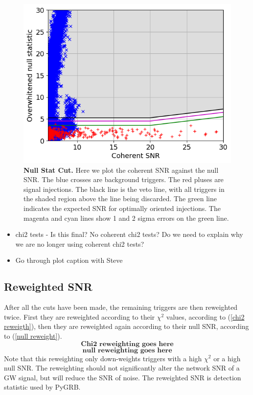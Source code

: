 \documentclass[11pt]{cuthesis}
\begin{document}
\begin{figure} %
\begin{center}
\includegraphics[width=0.8\linewidth]{GRB170817A_null_stat2_vs_snr_zoom.png}
\end{center}
\caption{\textbf{Null Stat Cut.} Here we plot the coherent SNR against the null SNR. The blue crosses are background triggers. The red pluses are signal injections. The black line is the veto line, with all triggers in the shaded region above the line being discarded. The green line indicates the expected SNR for optimally oriented injections. The magenta and cyan lines show 1 and 2 sigma errors on the green line. }
\label{fig:nullcut}
\end{figure}



\begin{itemize}
\item chi2 tests - Is this final? No coherent chi2 tests? Do we need to explain why we are no longer using coherent chi2 tests? 
\item Go through plot caption with Steve
\end{itemize}

\subsection{Reweighted SNR} \label{sec:reweighted snr}
After all the cuts have been made, the remaining triggers are then reweighted twice. First they are reweighted according to their $\chi^2$ values, according to (\ref{chi2 reweigth}), then they are reweighted again according to their null SNR, according to (\ref{null reweight}).  
\begin{equation} \label{chi2 reweigth}
\textbf{Chi2 reweighting goes here}
\end{equation}
\begin{equation} \label{null reweight}
\textbf{null reweighting goes here}
\end{equation}
Note that this reweighting only down-weights triggers with a high $\chi^2$ or a high null SNR. The reweighting should not significantly alter the network SNR of a GW signal, but will reduce the SNR of noise. The reweighted SNR is detection statistic used by PyGRB. 
\end{document}
